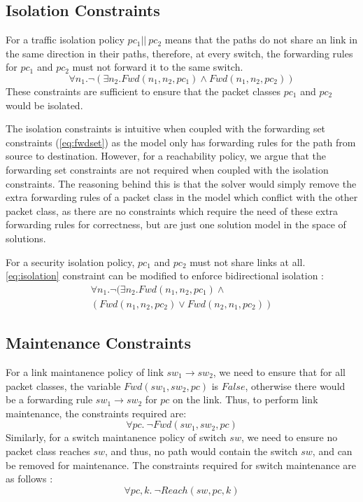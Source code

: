 \documentclass[]{sig}
\begin{document}
\subsection{Isolation Constraints}
For a traffic isolation policy $pc_1 || \ pc_2$ means that the paths do not share an link in the same direction in their paths, therefore, at every switch, the forwarding rules for $pc_1$ and $pc_2$ must not forward it to the same switch.  
\begin{equation}
	\forall n_1. \neg ( \exists n_2. Fwd(n_1,n_2,pc_1) \wedge Fwd(n_1,n_2,pc_2)) \label{eq:isolation}
\end{equation}
These constraints are sufficient to ensure that the packet classes $pc_1$ and $pc_2$ would be isolated. 

The isolation constraints is intuitive when coupled with the forwarding set constraints (\cref{eq:fwdset}) as the model only has forwarding rules for the path from source to destination. However, for a reachability policy, we argue that the forwarding set constraints are not required when coupled with the isolation constraints. The reasoning behind this is that the solver would simply remove the extra forwarding rules of a packet class in the model which conflict with the other packet class, as there are no constraints which require the need of these extra forwarding rules for correctness, but are just one solution model in the space of solutions. 

For a security isolation policy, $pc_1$ and $pc_2$ must not share links at all. \cref{eq:isolation} constraint can be modified to enforce bidirectional isolation :
\begin{multline}
\forall n_1. \neg ( \exists n_2. Fwd(n_1,n_2,pc_1) \wedge \\ (Fwd(n_1,n_2,pc_2) \vee Fwd(n_2,n_1,pc_2)) \label{eq:secisolation}
\end{multline}

\subsection{Maintenance Constraints}
For a link maintanence policy of link $sw_1 \rightarrow sw_2$, we need to ensure that for all packet classes, the variable $Fwd(sw_1, sw_2, pc)$ is $False$, otherwise there would be a forwarding rule $sw_1 \rightarrow sw_2$ for $pc$ on the link. Thus, to perform link maintenance, the constraints required are: 
\begin{equation}
	\forall pc. \ \neg Fwd(sw_1, sw_2, pc)
\end{equation}
Similarly, for a switch maintanence policy of switch $sw$, we need to ensure no packet class reaches $sw$, and thus, no path would contain the switch $sw$, and can be removed for maintenance. The constraints required for switch maintenance are as follows : 
\begin{equation}
	\forall pc, k. \ \neg Reach(sw, pc, k)  
\end{equation}
\end{document}
